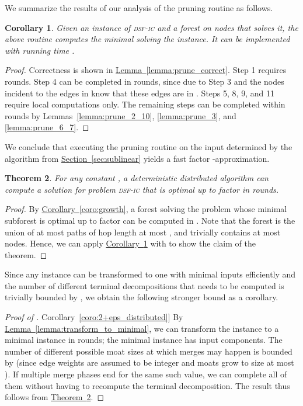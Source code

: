 \documentclass[letterpaper,11pt]{article}
\newtheorem{theorem}{Theorem}[section]
\newtheorem{corollary}[theorem]{Corollary}
\newcommand{\namedref}[2]{\hyperref[#2]{#1~\ref*{#2}}}
\newcommand{\sectionref}[1]{\namedref{Section}{#1}}
\newcommand{\theoremref}[1]{\namedref{Theorem}{#1}}
\newcommand{\lemmaref}[1]{\namedref{Lemma}{#1}}
\newcommand{\corollaryref}[1]{\namedref{Corollary}{#1}}
\newcommand{\sfic}{\textsc{dsf-ic}\xspace}
\begin{document}
We summarize the results of our analysis of the pruning routine as follows.

\begin{corollary}\label{coro:prune}
Given an instance of \sfic and a forest  on  nodes that solves
it, the above routine computes the minimal  solving the
instance. It can be implemented with running time .
\end{corollary}
\begin{proof}
Correctness is shown in \lemmaref{lemma:prune_correct}. Step 1 requires
 rounds. Step 4 can be completed in  rounds, since due
to Step 3  and the nodes incident to the edges in
 know that these edges are in . Steps 5, 8, 9, and 11
require local computations only. The remaining steps can be completed within
 rounds by Lemmas~\ref{lemma:prune_2_10}, \ref{lemma:prune_3},
and \ref{lemma:prune_6_7}.
\end{proof}

We conclude that executing the pruning routine on the input  determined by
the algorithm from \sectionref{sec:sublinear} yields a fast factor
-approximation.

\begin{theorem}\label{theorem:2+eps_distributed}
For any constant , a deterministic distributed algorithm can
compute a solution for problem \sfic that is optimal up to factor
 in  rounds.
\end{theorem}
\begin{proof}
By \corollaryref{coro:growth}, a forest solving the problem whose minimal
subforest is optimal up to factor  can be computed in
. Note that the
forest is the union of at most  paths of hop length at most , and
trivially contains at most  nodes. Hence, we can apply
\corollaryref{coro:prune} with  to show the claim of
the theorem.
\end{proof}

Since any instance can be transformed to one with minimal inputs efficiently and
the number of different terminal decompositions that needs to be computed is
trivially bounded by , we obtain the following stronger bound as a
corollary.

\begin{proof}[Proof of \corollaryref{coro:2+eps_distributed}]
By \lemmaref{lemma:transform_to_minimal}, we can transform the instance to a
minimal instance in  rounds; the minimal instance has  input
components. The number of different possible moat sizes at which merges may
happen is bounded by  (since edge weights are assumed to be integer and
moats grow to size at most ). If multiple merge phases end for the same
such value, we can complete all of them without having to recompute the terminal
decomposition. The result thus follows from
\theoremref{theorem:2+eps_distributed}.
\end{proof}
\end{document}

